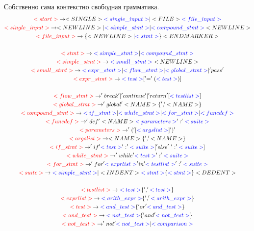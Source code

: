\documentclass[russian,a4paper]{article}
\newcommand{\ns}[1]{\textcolor{blue}{<#1>}}
\newcommand{\ls}[1]{\textcolor{red}{<#1>}}
\newcommand{\ts}[1]{<#1>}
\begin{document}
Собственно сама контекстно свободная грамматика.
{\scriptsize
\begin{gather*}
	\ls{start} \to \ts{SINGLE} \ns{single\_input} | \ts{FILE} \ns{file\_input}\\
      \ls{single\_input} \to \ts{NEWLINE} | \ns{simple\_stmt} | \ns{compound\_stmt} \ts{NEWLINE} \\
	\ls{file\_input} \to \{ \ts{NEWLINE} | \ns{stmt} \} \ts{ENDMARKER}\\ 
	\\
	\ls{stmt} \to \ns{simple\_stmt} | \ns{compound\_stmt}\\ 
	\ls{simple\_stmt} \to \ns{small\_stmt} \ts{NEWLINE}\\ 
	\ls{small\_stmt} \to \ns{expr\_stmt}  | \ns{flow\_stmt} | \ns{global\_stmt}|'pass' \\ 
	\ls{expr\_stmt} \to \ns{test} \lbrack '=' (\ns{test}) \rbrack \\ 
	\\
	\ls{flow\_stmt} \to 'break'| 'continue' | 'return' [\ns{testlist}]\\ 
	\ls{global\_stmt} \to 'global' \ts{NAME} \{',' \ts{NAME}\}\\ 
	\ls{compound\_stmt} \to \ns{if\_stmt} | \ns{while\_stmt} | \ns{for\_stmt} | \ns{funcdef}\\ 
	\ls{funcdef} \to 'def' \ts{NAME} \ns{parameters} ':' \ns{suite}\\ 
	\ls{parameters} \to '(' [\ns{argslist}] ')'\\ 
	\ls{argslist} \to \ts{NAME} \{',' \ts{NAME}\}\\ 
	\ls{if\_stmt} \to 'if' \ns{test} ':' \ns{suite} \lbrack 'else'\ ':' \ns{suite} \rbrack \\ 
	\ls{while\_stmt} \to 'while' \ns{test} ':' \ns{suite}\\ 
	\ls{for\_stmt} \to 'for' \ns{exprlist} 'in' \ns{testlist} ':' \ns{suite}\\ 
	\ls{suite} \to \ns{simple\_stmt} |  \ts{INDENT} \ns{stmt} \{\ns{stmt}\} \ts{DEDENT}\\
	\\
	\ls{testlist} \to \ns{test} \{',' \ns{test}\}\\ 
	\ls{exprlist} \to \ns{arith\_expr} \{',' \ns{arith\_expr}\}\\ 
	\ls{test} \to \ns{and\_test} \{'or' \ns{and\_test}\}\\ 
	\ls{and\_test} \to \ns{not\_test} \{'and' \ns{not\_test}\}\\ 
	\ls{not\_test} \to 'not' \ns{not\_test} | \ns{comparison}\\ 

\end{gather*}}
\end{document}

